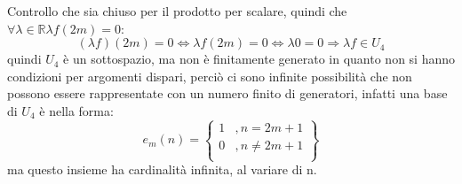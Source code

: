 \documentclass[a4paper,12pt]{article}
\begin{document}
	Controllo che sia chiuso per il prodotto per scalare, quindi che $\forall \lambda \in \mathbb{R} \lambda f(2m) = 0$:
	\[(\lambda f)(2m) = 0 \iff \lambda f(2m) = 0 \iff \lambda 0 = 0 \Rightarrow \lambda f \in U_4\]
	quindi $U_4$ è un sottospazio, ma non è finitamente generato in quanto non si hanno condizioni per argomenti dispari, perciò ci sono infinite possibilità che non possono essere rappresentate con un numero finito di generatori, infatti una base di $U_4$ è nella forma:
	\[e_m (n) = \left\{\begin{aligned}
		1&, n = 2m + 1\\
		0&, n \not = 2m + 1\\		
	\end{aligned}\right\}\] 
	ma questo insieme ha cardinalità infinita, al variare di n.
	
\end{document}
